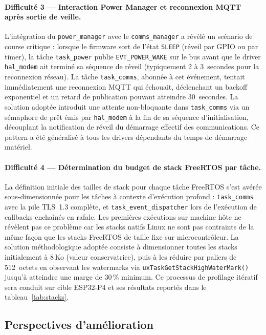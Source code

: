 \paragraph{Difficulté 3 — Interaction Power Manager et reconnexion MQTT
après sortie de veille.}
L'intégration du \texttt{power\_manager} avec le \texttt{comms\_manager}
a révélé un scénario de course critique : lorsque le firmware sort de
l'état \texttt{SLEEP} (réveil par GPIO ou par timer), la tâche
\texttt{task\_power} publie \texttt{EVT\_POWER\_WAKE} sur le bus avant
que le driver \texttt{hal\_modem} ait terminé sa séquence de réveil
(typiquement 2 à 3~secondes pour la reconnexion réseau). La tâche
\texttt{task\_comms}, abonnée à cet événement, tentait immédiatement
une reconnexion MQTT qui échouait, déclenchant un backoff exponentiel
et un retard de publication pouvant atteindre 30~secondes. La solution
adoptée introduit une attente non-bloquante dans \texttt{task\_comms}
via un sémaphore de prêt émis par \texttt{hal\_modem} à la fin de
sa séquence d'initialisation, découplant la notification de réveil
du démarrage effectif des communications. Ce pattern a été généralisé
à tous les drivers dépendants du temps de démarrage matériel.

\paragraph{Difficulté 4 — Détermination du budget de stack FreeRTOS
par tâche.}
La définition initiale des tailles de stack pour chaque tâche FreeRTOS
s'est avérée sous-dimensionnée pour les tâches à contexte d'exécution
profond : \texttt{task\_comms} avec la pile TLS~1.3 complète, et
\texttt{task\_event\_dispatcher} lors de l'exécution de callbacks
enchaînés en rafale. Les premières exécutions sur machine hôte ne
révèlent pas ce problème car les stacks natifs Linux ne sont pas
contraints de la même façon que les stacks FreeRTOS de taille fixe
sur microcontrôleur. La solution méthodologique adoptée consiste à
dimensionner toutes les stacks initialement à 8\,Ko (valeur
conservatrice), puis à les réduire par paliers de 512~octets en
observant les watermarks via \texttt{uxTaskGetStackHighWaterMark()}
jusqu'à atteindre une marge de 30\,\% minimum. Ce processus de
profilage itératif sera conduit sur cible ESP32-P4 et ses résultats
reportés dans le tableau~\ref{tab:stacks}.

\subsection*{Perspectives d'amélioration}

